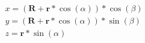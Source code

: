 \documentclass{article}
\begin{document}
\begin{align}
\textit{x}=(\textbf{R}+\textbf{r}*\cos{(\alpha)})*\cos{(\beta)}\\
\textit{y}=(\textbf{R}+\textbf{r}*\cos{(\alpha)})*\sin{(\beta)}\\
\textit{z}=\textbf{r}*\sin{(\alpha)}
\end{align}
\end{document}
